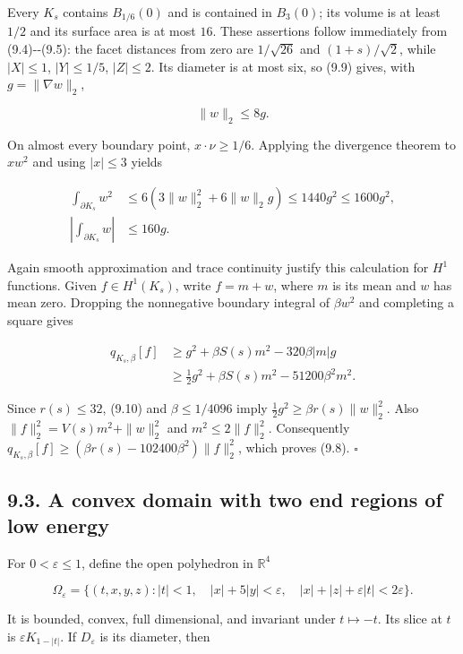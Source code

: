 \documentclass[11pt]{article}
\begin{document}
Every \(K_s\) contains \(B_{1/6}(0)\) and is contained in \(B_3(0)\);
its volume is at least \(1/2\) and its surface area is at most \(16\).
These assertions follow immediately from (9.4)-\/-(9.5): the facet
distances from zero are \(1/\sqrt{26}\) and \((1+s)/\sqrt2\), while
\(|X|\le1\), \(|Y|\le1/5\), \(|Z|\le2\). Its diameter is at most six, so
(9.9) gives, with \(g=\|\nabla w\|_2\),

\[
\|w\|_2\le8g.
\tag{9.10}
\]

On almost every boundary point, \(x\cdot\nu\ge1/6\). Applying the
divergence theorem to \(xw^2\) and using \(|x|\le3\) yields

\[
\begin{aligned}
\int_{\partial K_s}w^2
&\le6\left(3\|w\|_2^2+6\|w\|_2g\right)
\le1440g^2\le1600g^2,\\
\left|\int_{\partial K_s}w\right|&\le160g.
\end{aligned}
\tag{9.11}
\]

Again smooth approximation and trace continuity justify this calculation
for \(H^1\) functions. Given \(f\in H^1(K_s)\), write \(f=m+w\), where
\(m\) is its mean and \(w\) has mean zero. Dropping the nonnegative
boundary integral of \(\beta w^2\) and completing a square gives

\[
\begin{aligned}
q_{K_s,\beta}[f]
&\ge g^2+\beta S(s)m^2-320\beta|m|g\\
&\ge\tfrac12g^2+\beta S(s)m^2-51200\beta^2m^2.
\end{aligned}
\tag{9.12}
\]

Since \(r(s)\le32\), (9.10) and \(\beta\le1/4096\) imply
\(\tfrac12g^2\ge\beta r(s)\|w\|_2^2\). Also
\(\|f\|_2^2=V(s)m^2+\|w\|_2^2\) and \(m^2\le2\|f\|_2^2\). Consequently
\(q_{K_s,\beta}[f]\ge(\beta r(s)-102400\beta^2)\|f\|_2^2\), which proves
(9.8). \(\square\)

\subsection{9.3. A convex domain with two end regions of low
energy}\label{a-convex-domain-with-two-end-regions-of-low-energy}

For \(0<\varepsilon\le1\), define the open polyhedron in \(\mathbb R^4\)

\[
\Omega_\varepsilon=\{(t,x,y,z):
 |t|<1,\quad |x|+5|y|<\varepsilon,\quad
 |x|+|z|+\varepsilon|t|<2\varepsilon\}.
\tag{9.13}
\]

It is bounded, convex, full dimensional, and invariant under
\(t\mapsto-t\). Its slice at \(t\) is \(\varepsilon K_{1-|t|}\). If
\(D_\varepsilon\) is its diameter, then
\end{document}
